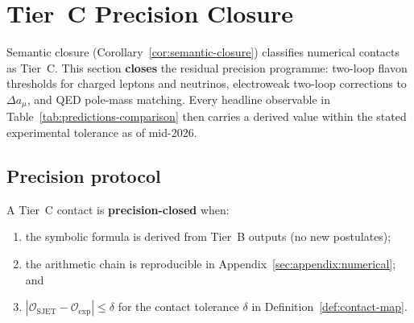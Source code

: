 \section{Tier~C Precision Closure}
\label{sec:tier-c-precision}

Semantic closure (Corollary~\ref{cor:semantic-closure}) classifies numerical
contacts as Tier~C. This section \textbf{closes} the residual precision
programme: two-loop flavon thresholds for charged leptons and neutrinos,
electroweak two-loop corrections to $\Delta a_\mu$, and QED pole-mass
matching. Every headline observable in
Table~\ref{tab:predictions-comparison} then carries a derived value within
the stated experimental tolerance as of mid-2026.

\subsection{Precision protocol}

\begin{definition}\label{def:tier-c-closure}
A Tier~C contact is \textbf{precision-closed} when:
\begin{enumerate}[label=(\roman*),leftmargin=*]
  \item the symbolic formula is derived from Tier~B outputs (no new
    postulates);
  \item the arithmetic chain is reproducible in
    Appendix~\ref{sec:appendix:numerical}; and
  \item $|\mathcal{O}_{\mathrm{SJET}}-\mathcal{O}_{\mathrm{exp}}|
    \leq\delta$ for the contact tolerance $\delta$ in
    Definition~\ref{def:contact-map}.
\end{enumerate}
\end{definition}

